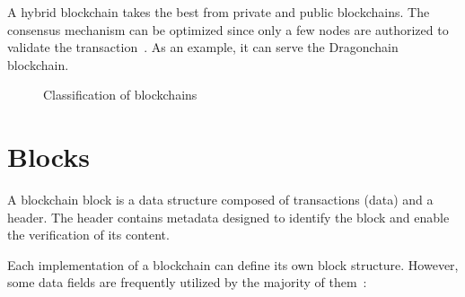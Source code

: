 A hybrid blockchain takes the best from private and public blockchains. The consensus mechanism can be optimized since only a few nodes are authorized to validate the transaction~\cite{comprehensive.survey.blockchain}. As an example, it can serve the Dragonchain blockchain.

\begin{figure}[h]
    \begin{center}
    \end{center}
    \caption{Classification of blockchains~\cite{comprehensive.survey.blockchain}}
    \label{figure:bc.typesTree}
\end{figure}



\section{Blocks}
\label{bc block}

A blockchain block is a data structure composed of transactions (data) and a header. The header contains metadata designed to identify the block and enable the verification of its content.

Each implementation of a blockchain can define its own block structure. However, some data fields are frequently utilized by the majority of them~\cite{bc.technology.overview}:

\bigskip

